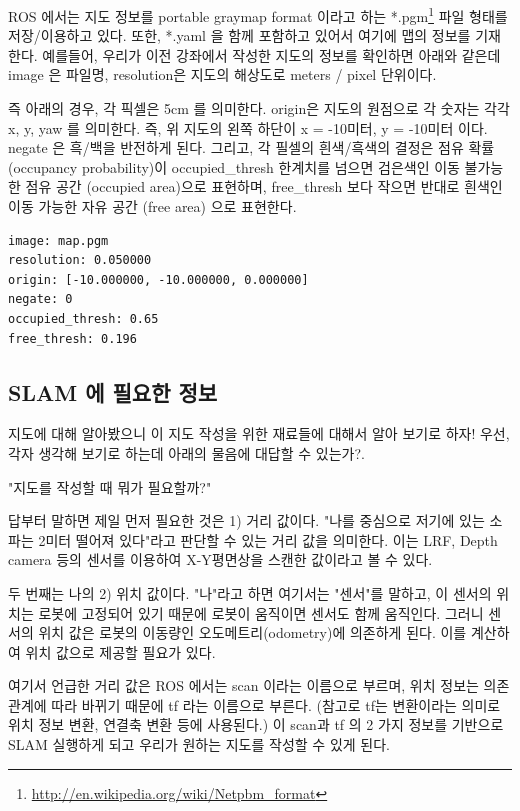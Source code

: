 ROS 에서는 지도 정보를 portable graymap format 이라고 하는 *.pgm\footnote{\url{http://en.wikipedia.org/wiki/Netpbm_format}} 파일 형태를 저장/이용하고 있다. 또한, *.yaml 을 함께 포함하고 있어서 여기에 맵의 정보를 기재한다. 예를들어, 우리가 이전 강좌에서 작성한 지도의 정보를 확인하면 아래와 같은데 image 은 파일명, resolution은 지도의 해상도로 meters / pixel 단위이다.

즉 아래의 경우, 각 픽셀은 5cm 를 의미한다. origin은 지도의 원점으로 각 숫자는 각각 x, y, yaw 를 의미한다. 즉, 위 지도의 왼쪽 하단이 x = -10미터, y = -10미터 이다. negate 은 흑/백을 반전하게 된다. 그리고, 각 필셀의 흰색/흑색의 결정은 점유 확률(occupancy probability)이 occupied\_thresh 한계치를 넘으면 검은색인 이동 불가능한 점유 공간 (occupied area)으로 표현하며, free\_thresh 보다 작으면 반대로 흰색인 이동 가능한 자유 공간 (free area) 으로 표현한다.

\vspace{\baselineskip}
\vspace{\baselineskip}
\begin{lstlisting}[language=ROS]
image: map.pgm
resolution: 0.050000
origin: [-10.000000, -10.000000, 0.000000]
negate: 0
occupied_thresh: 0.65
free_thresh: 0.196
\end{lstlisting}


\subsection{SLAM 에 필요한 정보}

지도에 대해 알아봤으니 이 지도 작성을 위한 재료들에 대해서 알아 보기로 하자! 우선, 각자 생각해 보기로 하는데 아래의 물음에 대답할 수 있는가?. 


"지도를 작성할 때 뭐가 필요할까?" 



답부터 말하면 제일 먼저 필요한 것은 1) 거리 값이다. "나를 중심으로 저기에 있는 소파는 2미터 떨어져 있다"라고 판단할 수 있는 거리 값을 의미한다. 이는 LRF, Depth camera 등의 센서를 이용하여 X-Y평면상을 스캔한 값이라고 볼 수 있다.

두 번째는 나의 2) 위치 값이다. "나"라고 하면 여기서는 "센서"를 말하고, 이 센서의 위치는 로봇에 고정되어 있기 때문에 로봇이 움직이면 센서도 함께 움직인다. 그러니 센서의 위치 값은 로봇의 이동량인 오도메트리(odometry)에 의존하게 된다. 이를 계산하여 위치 값으로 제공할 필요가 있다.

여기서 언급한 거리 값은 ROS 에서는 scan 이라는 이름으로 부르며, 위치 정보는 의존 관계에 따라 바뀌기 때문에 tf 라는 이름으로 부른다. (참고로 tf는 변환이라는 의미로 위치 정보 변환,  연결축 변환 등에 사용된다.) 이 scan과 tf 의 2 가지 정보를 기반으로 SLAM 실행하게 되고 우리가 원하는 지도를 작성할 수 있게 된다. 

